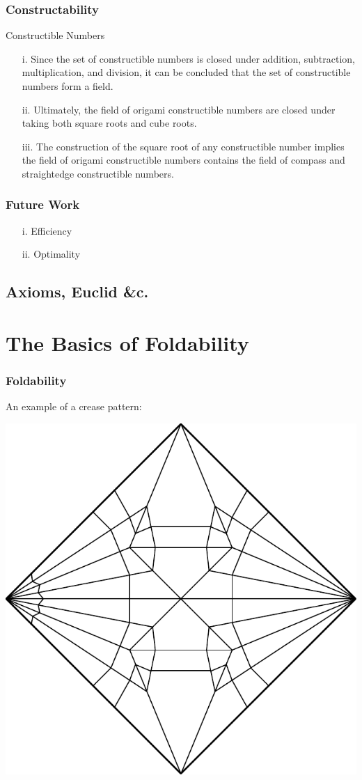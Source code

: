 \documentclass{beamer}
\begin{document}
\begin{frame}
\frametitle{Constructability}
\begin{block}{Constructible Numbers}
\begin{enumerate}
\item[i.]
Since the set of constructible numbers is closed under addition, subtraction, multiplication, and division, it can be concluded that the set of constructible numbers form a field.
\item[ii.]
Ultimately, the field of origami constructible numbers are closed under taking both square roots and cube roots.
\item[iii.]
The construction of the square root of any constructible number implies the field of origami constructible numbers contains the field of compass and straightedge constructible numbers.
\end{enumerate}
\end{block}
\end{frame}

\begin{frame}
\frametitle{Future Work}
\begin{enumerate}
\item[i.]
Efficiency
\item[ii.]
Optimality
\end{enumerate}
\end{frame}

\subsection{Axioms, Euclid \&c.}

\section{The Basics of Foldability}

\begin{frame}
\frametitle{Foldability}
\begin{block}{}
An example of a crease pattern:
\end{block}
\begin{center}
\includegraphics[width=.5\textwidth]{foldability_pix/crane-unassigned.pdf}
\end{center}
\end{frame}
\end{document}
